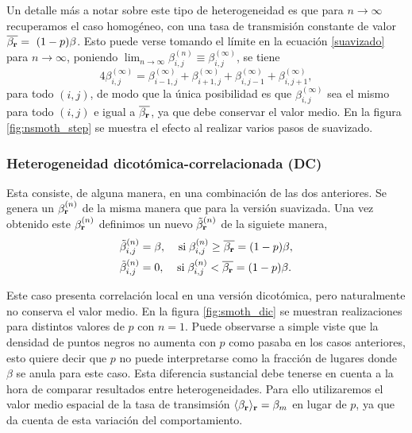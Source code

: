 Un detalle más a notar sobre este tipo de heterogeneidad es que para $n\rightarrow\infty$ recuperamos el caso
homogéneo, con una tasa de transmisión constante de valor $\overline{\beta_{\vb r}}=~(1-p)\beta$. Esto puede verse tomando el límite en la ecuación \ref{suavizado} para $n\rightarrow\infty$, poniendo 
$\lim_{n\to \infty}\beta^{(n)}_{i,j}\equiv\beta^{(\infty)}_{i,j}$, se tiene
\[
  4\beta^{(\infty)}_{i,j} = \beta^{(\infty)}_{i-1,j} + \beta^{(\infty)}_{i+1,j} + \beta^{(\infty)}_{i,j-1} + \beta^{(\infty)}_{i,j+1},
\]
para todo $(i,j)$, de modo que la única posibilidad es que $\beta^{(\infty)}_{i,j}$ sea el mismo para todo $(i,j)$ e igual a $\overline{\beta_{\vb r}}$, ya que debe
conservar el valor medio. En la figura \ref{fig:nsmoth_step} se muestra el efecto al realizar varios pasos de suavizado.


\vspace*{-.5cm}
\subsubsection*{Heterogeneidad dicotómica-correlacionada (DC)}

Esta consiste, de alguna manera, en una combinación de las dos anteriores. Se genera un $\beta^{(n)}_{\vb r}$ de la misma manera que para la versión 
suavizada. Una vez obtenido este $\beta^{(n)}_{\vb r}$ definimos un nuevo $\tilde{\beta}^{(n)}_{\vb r}$ de la siguiete manera,
\begin{align*}
  \tilde{\beta}^{(n)}_{i,j} &= \beta, \; \;\;\; \mbox{si}\; \beta^{(n)}_{i,j}\geq\overline{\beta_{\vb r}}=(1-p)\beta,  \\
  \tilde{\beta}^{(n)}_{i,j} &= 0,  \;\;\;\;\mbox{si}\; \beta^{(n)}_{i,j}<\overline{\beta_{\vb r}}=(1-p)\beta.
\end{align*}

Este caso presenta correlación local en una versión dicotómica, pero naturalmente no conserva el valor medio. En la figura \ref{fig:smoth_dic} se muestran 
realizaciones para distintos valores de $p$ con $n=1$. Puede observarse a simple viste que la densidad de puntos negros no aumenta con $p$ como 
pasaba en los casos anteriores, esto quiere decir que $p$ no puede interpretarse como la fracción de lugares donde $\beta$ se anula para este caso. Esta diferencia sustancial debe tenerse en cuenta a la hora de comparar resultados entre heterogeneidades. Para ello utilizaremos el valor medio espacial de la tasa de transimsión
$\langle\beta_{\vb r}\rangle_{\vb r} = \beta_m$ en lugar de $p$, ya que da cuenta de esta variación del comportamiento.

